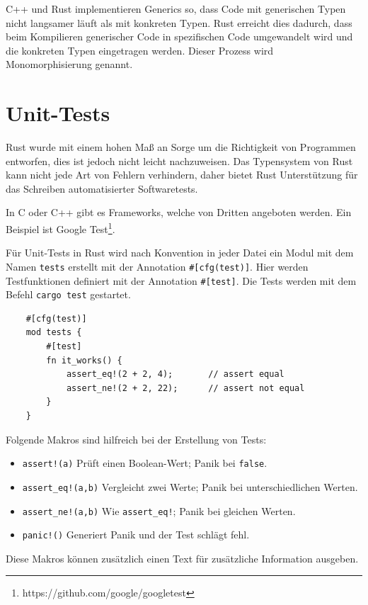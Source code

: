 C++ und Rust implementieren Generics so, dass Code mit generischen Typen nicht langsamer läuft als mit konkreten Typen. Rust erreicht dies dadurch, dass beim Kompilieren generischer Code in spezifischen Code umgewandelt wird und die konkreten Typen eingetragen werden. Dieser Prozess wird Monomorphisierung genannt.


\section{Unit-Tests}

Rust wurde mit einem hohen Maß an Sorge um die Richtigkeit von Programmen entworfen, dies ist jedoch nicht leicht nachzuweisen. Das Typensystem von Rust kann nicht jede Art von Fehlern verhindern, daher bietet Rust Unterstützung für das Schreiben automatisierter Softwaretests.

In C oder C++ gibt es Frameworks, welche von Dritten angeboten werden. Ein Beispiel ist Google Test\footnote{https://github.com/google/googletest}.

Für Unit-Tests in Rust wird nach Konvention in jeder Datei ein Modul mit dem Namen \verb"tests" erstellt mit der Annotation \verb"#[cfg(test)]". Hier werden Testfunktionen definiert mit der Annotation \verb"#[test]". Die Tests werden mit dem Befehl \verb"cargo test" gestartet.

\begin{lstlisting}
    #[cfg(test)]
    mod tests {
        #[test]
        fn it_works() {
            assert_eq!(2 + 2, 4);       // assert equal
            assert_ne!(2 + 2, 22);      // assert not equal
        }
    }
\end{lstlisting}

Folgende Makros sind hilfreich bei der Erstellung von Tests:

\begin{itemize}
    \item \verb"assert!(a)" Prüft einen Boolean-Wert; Panik bei \verb"false".
    \item \verb"assert_eq!(a,b)" Vergleicht zwei Werte; Panik bei unterschiedlichen Werten.
    \item \verb"assert_ne!(a,b)" Wie \verb"assert_eq!"; Panik bei gleichen Werten.
    \item \verb"panic!()" Generiert Panik und der Test schlägt fehl.
\end{itemize}

Diese Makros können zusätzlich einen Text für zusätzliche Information ausgeben.

